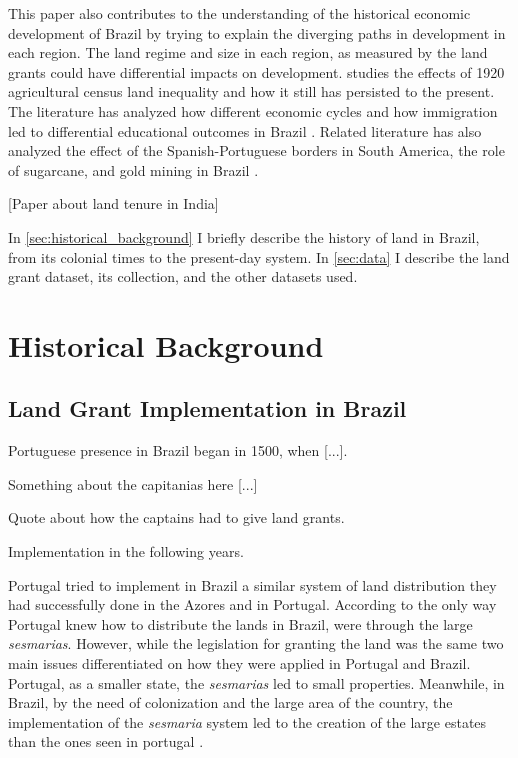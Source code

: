 \documentclass{article}
\begin{document}
This paper also contributes to the understanding of the historical economic development of Brazil by trying to explain the diverging paths in development in each region. 
The land regime and size in each region, as measured by the land grants could have differential impacts on development.
\textcite{Wigton-Jones2020-ex} studies the effects of 1920 agricultural census land inequality and how it still has persisted to the present.
The literature has analyzed how different economic cycles and how immigration led to differential educational outcomes in Brazil \parencites{Musacchio2014-pq}{Rocha2017-yq}{de-Carvalho-Filho2012-pc}.
Related literature has also analyzed the effect of the Spanish-Portuguese borders in South America, the role of sugarcane, and gold mining in Brazil \parencites{Laudares2022-vy}{Naritomi2012-or}.

\parencite{Dell2010-qt}
\parencite{Sokoloff2000-mb}

\textcite{Ratnoo2023-vw} [Paper about land tenure in India]

\textcite{Albertus2018-bf}

In \autoref{sec:historical_background} I briefly describe the history of land in Brazil, from its colonial times to the present-day system. In \autoref{sec:data} I describe the land grant dataset, its collection, and the other datasets used.

\section{Historical Background}
\label{sec:historical_background}

\subsection{Land Grant Implementation in Brazil}

Portuguese presence in Brazil began in 1500, when [...].

Something about the capitanias here [...] 

Quote about how the captains had to give land grants. 

Implementation in the following years.

Portugal tried to implement in Brazil a similar system of land distribution they had successfully done in the Azores and in Portugal. 
According to \textcite{Smith1944-oi} the only way Portugal knew how to distribute the lands in Brazil, were through the large \textit{sesmarias}.
However, while the legislation for granting the land was the same two main issues differentiated on how they were applied in Portugal and Brazil. 
Portugal, as a smaller state, the \textit{sesmarias} led to small properties. 
Meanwhile, in Brazil, by the need of colonization and the large area of the country, the implementation of the \textit{sesmaria} system led to the creation of the large estates than the ones seen in portugal \parencites[p.~58-59]{Da_Costa_Porto1979-dz}[p.~28]{Diffie1987-bw}[p.~23-24]{Panini1990-rj}.
\end{document}
